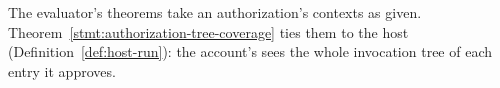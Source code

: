 The evaluator's theorems take an authorization's contexts as given.
Theorem~\ref{stmt:authorization-tree-coverage} ties them to the host
(Definition~\ref{def:host-run}): the account's  sees the
whole invocation tree of each entry it approves.


